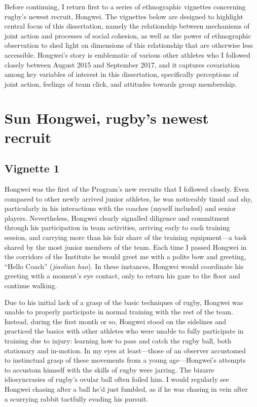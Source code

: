 Before continuing, I return first to a series of ethnographic vignettes concerning rugby's newest recruit, Hongwei. The vignettes below are designed to highlight central focus of this dissertation, namely the relationship between mechanisms of joint action and processes of social cohesion, as well as the power of ethnographic observation to shed light on dimensions of this relationship that are otherwise less accessible.  Hongwei's story is emblematic of various other athletes who I followed closely between August 2015 and September 2017, and it captures covariation among key variables of interest in this dissertation, specifically perceptions of joint action, feelings of team click, and attitudes towards group membership.

\section{Sun Hongwei, rugby's newest recruit}

\subsection{Vignette 1}
Hongwei was the first of the Program’s new recruits that I followed closely. Even compared to other newly arrived junior athletes, he was noticeably timid and shy, particularly in his interactions with the coaches (myself included) and senior players. Nevertheless, Hongwei clearly signalled diligence and commitment through his participation in team activities, arriving early to each training session, and carrying more than his fair share of the training equipment---a task shared by the most junior members of the team.  Each time I passed Hongwei in the corridors of the Institute he would greet me with a polite bow and greeting, ``Hello Coach'' (\textit{jiaolian hao}).  In these instances, Hongwei would coordinate his greeting with a moment's eye contact, only to return his gaze to the floor and continue walking.

Due to his initial lack of a grasp of the basic techniques of rugby, Hongwei was unable to properly participate in normal training with the rest of the team. Instead, during the first month or so, Hongwei stood on the sidelines and practiced the basics with other athletes who were unable to fully participate in training due to injury: learning how to pass and catch the rugby ball, both stationary and in-motion. In my eyes at least---those of an observer accustomed to instinctual grasp of these movements from a young age---Hongwei's attempts to accustom himself with the skills of rugby were jarring.  The bizarre idiosyncrasies of rugby's ovular ball often foiled him. I would regularly see Hongwei chasing after a ball he'd just fumbled, as if he was chasing in vein after a scurrying rabbit tactfully evading his pursuit.

